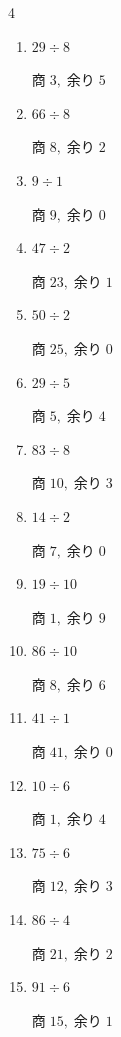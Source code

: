 \begin{multicols}{4}
\begin{enumerate}
        $商\; 3,\; 余り\; 3$

  \item $29 \div 8$

        $商\; 3,\; 余り\; 5$

  \item $66 \div 8$

        $商\; 8,\; 余り\; 2$

  \item $9 \div 1$

        $商\; 9,\; 余り\; 0$

  \item $47 \div 2$

        $商\; 23,\; 余り\; 1$

  \item $50 \div 2$

        $商\; 25,\; 余り\; 0$

  \item $29 \div 5$

        $商\; 5,\; 余り\; 4$

  \item $83 \div 8$

        $商\; 10,\; 余り\; 3$

  \item $14 \div 2$

        $商\; 7,\; 余り\; 0$

  \item $19 \div 10$

        $商\; 1,\; 余り\; 9$

  \item $86 \div 10$

        $商\; 8,\; 余り\; 6$

  \item $41 \div 1$

        $商\; 41,\; 余り\; 0$

  \item $10 \div 6$

        $商\; 1,\; 余り\; 4$

  \item $75 \div 6$

        $商\; 12,\; 余り\; 3$

  \item $86 \div 4$

        $商\; 21,\; 余り\; 2$

  \item $91 \div 6$

        $商\; 15,\; 余り\; 1$


\end{enumerate}
\end{multicols}
